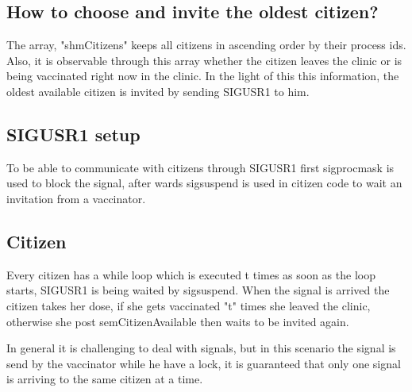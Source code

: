 \documentclass{article}
\begin{document}
\subsection*{ How to choose and invite the oldest citizen? }
     The array, "shmCitizens" keeps all citizens in ascending order by their process ids. Also, it is observable through this array whether the citizen leaves the clinic or is being vaccinated right now in the clinic. In the light of this this information, the oldest available citizen is invited by sending SIGUSR1 to him. 
\subsection*{SIGUSR1 setup}
    To be able to communicate with citizens through SIGUSR1 first sigprocmask is used to block the signal, after wards sigsuspend is used in citizen code to wait an invitation from a vaccinator.
\subsection*{Citizen}
    Every citizen has a while loop which is executed t times as soon as the loop starts, SIGUSR1 is being waited by sigsuspend. When the signal is arrived the citizen takes her dose, if she gets vaccinated "t" times she leaved the clinic, otherwise she post semCitizenAvailable then waits to be invited again.
    
    In general it is challenging to deal with signals, but in this scenario the signal is send by the vaccinator while he have a lock, it is guaranteed that only one signal is arriving to the same citizen at a time. 

    
\end{document}
